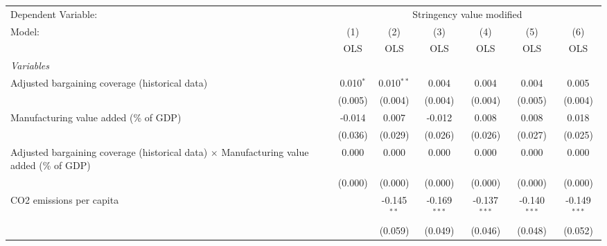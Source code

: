 
\begingroup
\centering
\begin{tabular}{lcccccc}
   \toprule
   Dependent Variable: & \multicolumn{6}{c}{Stringency value modified}\\
   Model:                                                                                          & (1)         & (2)           & (3)            & (4)            & (5)            & (6)\\  
                                                                                                   &  OLS        & OLS           & OLS            & OLS            & OLS            & OLS\\  
   \midrule
   \emph{Variables}\\
   Adjusted bargaining coverage (historical data)                                                  & 0.010$^{*}$ & 0.010$^{**}$  & 0.004          & 0.004          & 0.004          & 0.005\\   
                                                                                                   & (0.005)     & (0.004)       & (0.004)        & (0.004)        & (0.005)        & (0.004)\\   
   Manufacturing value added (\% of GDP)                                                           & -0.014      & 0.007         & -0.012         & 0.008          & 0.008          & 0.018\\   
                                                                                                   & (0.036)     & (0.029)       & (0.026)        & (0.026)        & (0.027)        & (0.025)\\   
   Adjusted bargaining coverage (historical data) $\times$ Manufacturing value added (\% of GDP)   & 0.000       & 0.000         & 0.000          & 0.000          & 0.000          & 0.000\\   
                                                                                                   & (0.000)     & (0.000)       & (0.000)        & (0.000)        & (0.000)        & (0.000)\\   
   CO2 emissions per capita                                                                        &             & -0.145$^{**}$ & -0.169$^{***}$ & -0.137$^{***}$ & -0.140$^{***}$ & -0.149$^{***}$\\   
                                                                                                   &             & (0.059)       & (0.049)        & (0.046)        & (0.048)        & (0.052)\\   

\end{tabular}
